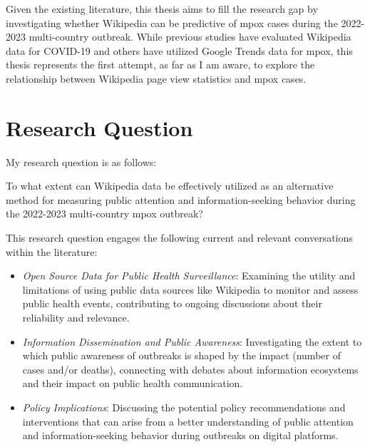 \documentclass[
  letterpaper,
  DIV=11,
  numbers=noendperiod]{scrartcl}
\begin{document}
Given the existing literature, this thesis aims to fill the research gap
by investigating whether Wikipedia can be predictive of mpox cases
during the 2022-2023 multi-country outbreak. While previous studies have
evaluated Wikipedia data for COVID-19 and others have utilized Google
Trends data for mpox, this thesis represents the first attempt, as far
as I am aware, to explore the relationship between Wikipedia page view
statistics and mpox cases.

\hypertarget{research-question}{%
\section{Research Question}\label{research-question}}

My research question is as follows:

\begin{tcolorbox}[enhanced jigsaw, colframe=quarto-callout-note-color-frame, leftrule=.75mm, breakable, opacityback=0, bottomrule=.15mm, left=2mm, rightrule=.15mm, colback=white, toprule=.15mm, arc=.35mm]

To what extent can Wikipedia data be effectively utilized as an
alternative method for measuring public attention and
information-seeking behavior during the 2022-2023 multi-country mpox
outbreak?

\end{tcolorbox}

This research question engages the following current and relevant
conversations within the literature:

\begin{itemize}
\item
  \emph{Open Source Data for Public Health Surveillance}: Examining the
  utility and limitations of using public data sources like Wikipedia to
  monitor and assess public health events, contributing to ongoing
  discussions about their reliability and relevance.
\item
  \emph{Information Dissemination and Public Awareness}: Investigating
  the extent to which public awareness of outbreaks is shaped by the
  impact (number of cases and/or deaths), connecting with debates about
  information ecosystems and their impact on public health
  communication.
\item
  \emph{Policy Implications}: Discussing the potential policy
  recommendations and interventions that can arise from a better
  understanding of public attention and information-seeking behavior
  during outbreaks on digital platforms.
\end{itemize}
\end{document}
